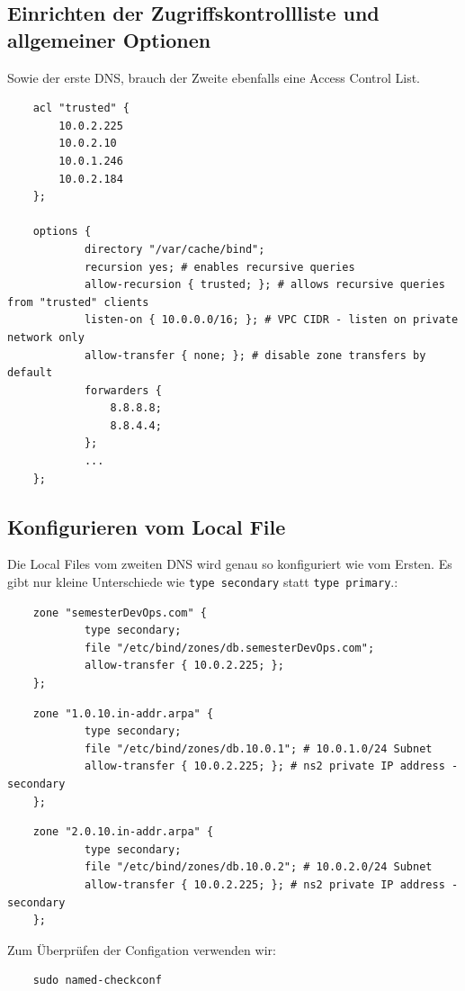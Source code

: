 \documentclass[a4paper,12pt]{article}
\begin{document}
\subsection{Einrichten der Zugriffskontrollliste und allgemeiner Optionen}
\label{sec:dns-acces-controll-list}  

Sowie der erste DNS, brauch der Zweite ebenfalls eine Access Control List.
\begin{verbatim}
	acl "trusted" {
		10.0.2.225
		10.0.2.10
		10.0.1.246
		10.0.2.184
	};

	options {
			directory "/var/cache/bind";
			recursion yes; # enables recursive queries
			allow-recursion { trusted; }; # allows recursive queries from "trusted" clients
			listen-on { 10.0.0.0/16; }; # VPC CIDR - listen on private network only
			allow-transfer { none; }; # disable zone transfers by default
			forwarders {
				8.8.8.8;
				8.8.4.4;
			};
			...
	};
\end{verbatim}


\subsection{Konfigurieren vom Local File}
Die Local Files vom zweiten DNS wird genau so konfiguriert wie vom Ersten. 
Es gibt nur kleine Unterschiede wie \texttt{type secondary} statt \texttt{type primary}.: 


\begin{verbatim}
	zone "semesterDevOps.com" {
			type secondary;
			file "/etc/bind/zones/db.semesterDevOps.com"; 
			allow-transfer { 10.0.2.225; };
	};
\end{verbatim}


\begin{verbatim}
	zone "1.0.10.in-addr.arpa" {
			type secondary;
			file "/etc/bind/zones/db.10.0.1"; # 10.0.1.0/24 Subnet
			allow-transfer { 10.0.2.225; }; # ns2 private IP address - secondary
	};
\end{verbatim}


\begin{verbatim}
	zone "2.0.10.in-addr.arpa" {
			type secondary;
			file "/etc/bind/zones/db.10.0.2"; # 10.0.2.0/24 Subnet
			allow-transfer { 10.0.2.225; }; # ns2 private IP address - secondary
	};
\end{verbatim}

Zum Überprüfen der Configation verwenden wir:
\begin{verbatim}
	sudo named-checkconf
\end{verbatim}
\end{document}

